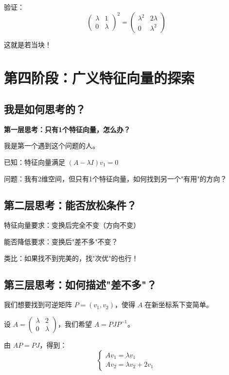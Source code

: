 \documentclass[12pt,a4paper]{article}
\begin{document}
验证：
\[
\begin{pmatrix} \lambda & 1 \\ 0 & \lambda \end{pmatrix}^2
= \begin{pmatrix} \lambda^2 & 2\lambda \\ 0 & \lambda^2 \end{pmatrix}
\]

这就是若当块！

\section{第四阶段：广义特征向量的探索}

\subsection{我是如何思考的？}

\textbf{第一层思考：只有1个特征向量，怎么办？}

我是第一个遇到这个问题的人。

已知：特征向量满足 $(A-\lambda I)v_1 = 0$

问题：我有2维空间，但只有1个特征向量，如何找到另一个"有用"的方向？

\subsection{第二层思考：能否放松条件？}

特征向量要求：变换后完全不变（方向不变）

能否降低要求：变换后"差不多"不变？

类比：如果找不到完美的，找"次优"的也行！

\subsection{第三层思考：如何描述"差不多"？}

我们想要找到可逆矩阵 $P = (v_1, v_2)$，使得 $A$ 在新坐标系下变简单。

设 $A = \begin{pmatrix} \lambda & 2 \\ 0 & \lambda \end{pmatrix}$，我们希望 $A = PJ P^{-1}$。

由 $AP = PJ$，得到：
\[
\begin{cases}
A v_1 = \lambda v_1 \\
A v_2 = \lambda v_2 +  2v_1
\end{cases}
\]
\end{document}
